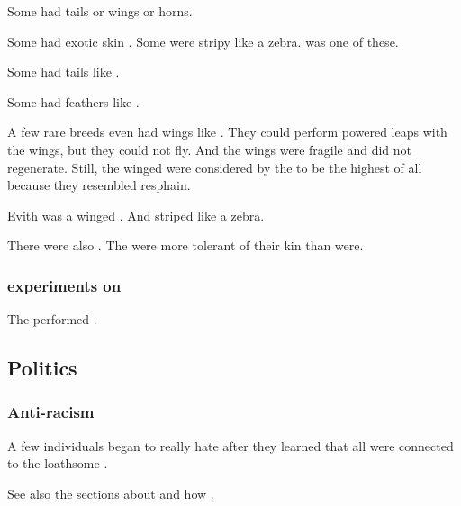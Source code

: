 \begin{gloss}
    Some had tails or wings or horns. 
    
    Some had exotic skin \colours. 
    Some were stripy like a zebra. 
     was one of these. 

    Some \demihumans had tails like \nephilim.
    
    Some had feathers like \resphain.
    
    A few rare breeds even had wings like \resphain. 
    They could perform powered leaps with the wings, but they could not fly. 
    And the wings were fragile and did not regenerate. 
    Still, the winged \humans were considered by the \resphain to be the highest of all \humans because they resembled resphain. 
    
    Evith was a winged \demihuman. 
    And striped like a zebra. 
\end{gloss}




There were also .
The \scathae were more tolerant of their kin than \humans were. 





\subsubsection{\Resphan experiments on \humans}
The \resphain performed . 









\subsection{Politics}





\subsubsection{Anti-\human racism}
A few individuals began to really hate \humans after they learned that all \humans were connected to the loathsome \Lithrim. 

See also the sections about  and how . 

